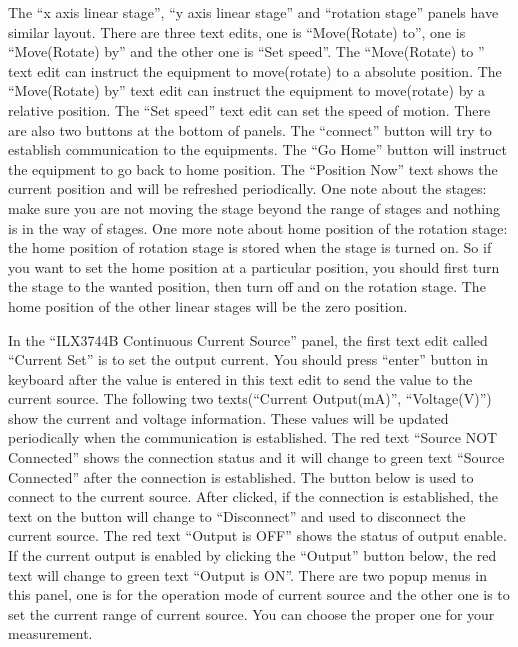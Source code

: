 \documentclass[a4paper,12pt]{article}
\begin{document}
The ``x axis linear stage'', ``y axis linear stage'' and ``rotation stage''
panels have similar layout. There are three text edits, one is ``Move(Rotate)
to'', one is ``Move(Rotate) by'' and the other one is ``Set speed''. The
``Move(Rotate) to '' text edit can instruct the equipment to move(rotate) to a
absolute position. The ``Move(Rotate) by'' text edit can instruct the equipment
to move(rotate) by a relative position. The ``Set speed'' text edit can set the
speed of motion. There are also two buttons at the bottom of panels. The
``connect'' button will try to establish communication to the equipments. The
``Go Home'' button will instruct the equipment to go back to home position. The
``Position Now'' text shows the current position and will be refreshed
periodically. One note about the stages: make sure you are not moving the stage
beyond the range of stages and nothing is in the way of stages. One more note
about home position of the rotation stage: the home position of rotation stage
is stored when the stage is turned on. So if you want to set the home position
at a particular position, you should first turn the stage to the wanted
position, then turn off and on the rotation stage. The home position of the
other linear stages will be the zero position.

In the ``ILX3744B Continuous Current Source'' panel, the first text edit called
``Current Set'' is to set the output current. You should press ``enter'' button in
keyboard after the value is entered in this text edit to send the value to the
current source. The following two texts(``Current Output(mA)'', ``Voltage(V)'') show
the current and voltage information. These values will be updated periodically
when the communication is established. The red text ``Source NOT Connected'' shows
the connection status and it will change to green text ``Source Connected'' after
the connection is established. The button below is used to connect to the
current source. After clicked, if the connection is established, the text on the
button will change to ``Disconnect'' and used to disconnect the current source.
The red text ``Output is OFF'' shows the status of output enable. If the current
output is enabled by clicking the ``Output'' button below, the red text will
change to green text ``Output is ON''. There are two popup menus in this panel,
one is for the operation mode of current source and the other one is to set the
current range of current source. You can choose the proper one for your
measurement.
\end{document}
